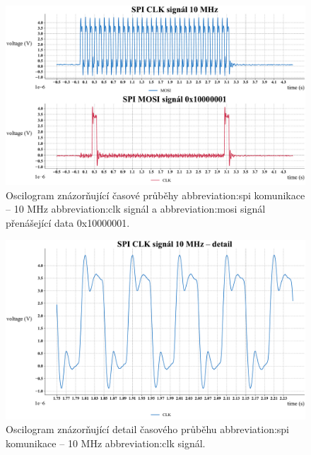 \documentclass[a4paper, twoside, 11pt]{article}
\newcommand{\fbar}{\FloatBarrier}
\begin{document}
	\begin{figure}[htbp!]
		\centering
		\includegraphics[width=1\textwidth]{src/python-graph/spi-osciloscope-data/pdf/clk-data-full-graph.pdf}
		\caption{Oscilogram znázorňující časové průběhy \gls{abbreviation:spi} komunikace – 10 MHz \gls{abbreviation:clk} signál a \gls{abbreviation:mosi} signál přenášející data 0x10000001.}
		\label{fig:clk-data-full-graph}
	\end{figure}


	\begin{figure}[htbp!]
		\centering
		\includegraphics[width=1\textwidth]{src/python-graph/spi-osciloscope-data/pdf/clk-mid-graph.pdf}
		\caption{Oscilogram znázorňující detail časového průběhu \gls{abbreviation:spi} komunikace – 10 MHz \gls{abbreviation:clk} signál.}
		\label{fig:clk-mid-graph}
	\end{figure}

	

	\fbar
\end{document}
